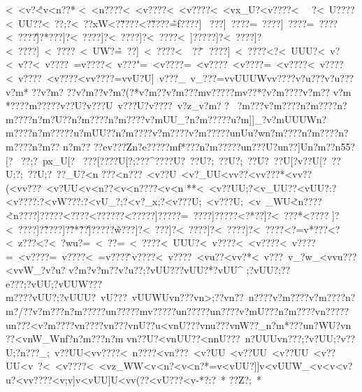 {{{{{{{{{{{{{{{{{{{{{{{{{{{{{{{{{{{{{{{{{{{{{{{{{{{{{{{{{{{{{{{{{{{{{{{{{{{{{{{{{{{{{{{{{{{{{{{{{{{{{{{{{{{{{{{{{{{{{{{{{{{{{{{{{{{{{{{{{{{{{{{{{{{{{{{{{{{{{{{{{{{{{{{{{{{{{{{{{{{{{{{{{{{{{{{{{{{{{{{{{{{{{{{{{{{{{{{{{{{{{{{{{{{{{{{{{{{{{{{{{{{{{{{{{{{{{{{{{{{{{{{{{{{{{{{{{{{{{{{{{{{{{{{{{{{{{{{{{{{{{{{{{{{{{{{{{{{{{{{{{{{{{{{{{{{{{{{{{{{{{{{{{{{{{{{{{{{{{{{{{{{{{{{{{{{{{{{{{{{{{{{{{{{{{{{{{{{{{{{{{{{{{{{{{{{{{{{{{{{{{{{{{{{{{{{{{{{{{{{{{{{{{{{{{{{{{{{{{{{{{{{{{{{{{{{{{{{{{{<~<v?\^<v<n??*
<~<n????<~<v????<~<v????<~<vx_U?<v????<~~  
?<~U????<~UU??<~??;?<~??xW<?\v????<?\v????\~=f????\?]~
???\?]~????\?=~????\?]~????\?=~????\?<~????\~]?*???]?<~????]?<~????]?<~????<~]?????]?<~????]?<~????]~<~????}~<~UW?\~=~??]~<~????<~~??  \~~????]~<~????<?<~UUU?<~v?   <~v??  <~v????~=v????<~v???"=~<v????=~<v????~<v????=~<v????<~v????<~v????~<v????<vv????=vvU?U]~v???_~v_???=vvUUUWvv????v?u??? v?u???
v?m*
??v?m? ??v?m  ??v?m?(?*v?m??v?m???mv?????mv??*?v?m????v?m??
v?m
*????m?????v??U?v???U~v???U?v????~v?z_v?m? ? ~?m???v?m????n?m????n?m????n?m?U??n?m????n?m????v?mUU_?n?m?????u?m]]_?v?mUUUWn?m????n?m?????u?mUU??n?m????v?m????v?m?????unUu?wn?m????n?m????n?m????n?m??
n?m?? ??ev???Zn?e?????mf*???n?m?????un???U?un??]Un?m? ?n55?[?~ 
??;?~px_U[?~	??{?[????U[?;? ??^{?? ??U{?~ ??U{?;~ ??U{?;~ ??U{?~ ??U[?v ??U[?~ ??U;?;~ ??U;?~??_U?<n 
???<n ???~<v??U~<v?_UU<vv?? <vv???*<vv??( <vv???~<v?}UU<v<n ??<v<n????<v<n ** <~<v??UU;?<v_UU??<vUU?:?<v????:?<vW???:?<vU_?;?<v?_x;?<v???U;~<v???U;~<v~_WU\~<n????\~<n????\?]?????\?<???  }?<?????}?<?????]?\?????\?=~????\?]?????\?<?*?? ]?<~???*\?<???? ]?<~????]?\~????]?\~?*\?\~??\~]?????\?\~w???]?<~???]?<~????]?<~????]?<~????<?=v*???<?<~z???<?<~?wu?=~<~}??=~<~????\?<~UUU?<~v????<~<v????<~v????=~<v????=~v????<~=v????\~v????<~v????~<vu??<vv?* <~v???~v_?w_<vvu???<vvW_?v?u ?  v?m?   v?m??  v?u?? ;?vUU???vUU?*?vUU^ ;?vUU? ;??e??? ;?vUU;?vUUW???m??? ?vUU? ;?vUUU?~vU???~vUUWUvn??? vn>;??vn  ??~n????v?m????v?m????n?m?/??v?m???n?m?????un?????mv?????un?????un????v?mU???n?m????vn?????un???<v?m????vn????vn??}?vnU??u<vnU???vnu???vnW??_n?m*???un?WU?vn
??<vnW_Wnf?  n?m??? n?m    vn??U?<vnUU??<nnU???~n?UUUvn ???;?v?UU;?v ??U;?n???_;~v??UU<vv????<~n????<vn ???~<v?UU~<v??UU~<v??UU~<v??UU<v~?  <~<v????<~<vz_WW<v<n ?  <v<n?* =v<vUU?]]v<vUUW_<v<v    <v?u   ?<vv????<v;v  ]v<vUU]U<vv(  ??<vU???<v-*?:?~*
??Z?;~*
}}}}}}}}}}}}}}}}}}}}}}}}}}}}}}}}}}}}}}}}}}}}}}}}}}}}}}}}}}}}}}}}}}}}}}}}}}}}}}}}}}}}}}}}}}}}}}}}}}}}}}}}}}}}}}}}}}}}}}}}}}}}}}}}}}}}}}}}}}}}}}}}}}}}}}}}}}}}}}}}}}}}}}}}}}}}}}}}}}}}}}}}}}}}}}}}}}}}}}}}}}}}}}}}}}}}}}}}}}}}}}}}}}}}}}}}}}}}}}}}}}}}}}}}}}}}}}}}}}}}}}}}}}}}}}}}}}}}}}}}}}}}}}}}}}}}}}}}}}}}}}}}}}}}}}}}}}}}}}}}}}}}}}}}}}}}}}}}}}}}}}}}}}}}}}}}}}}}}}}}}}}}}}}}}}}}}}}}}}}}}}}}}}}}}}}}}}}}}}}}}}}}}}}}}}}}}}}}}}}}}}}}}}}}}}}}}}}}}}}}}}}}}}}}}}}}}}}}}}}}}}}}}}}}}}}}}}}}}}
